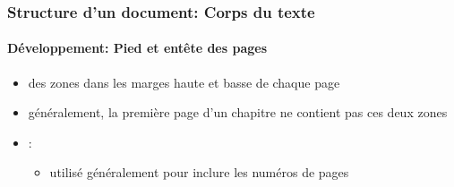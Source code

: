 \documentclass[xcolor=table]{beamer}
\begin{document}
\begin{frame}
\frametitle{Structure d'un document: Corps du texte}
\framesubtitle{Développement: Pied et entête des pages}

\begin{minipage}{0.52\textwidth}
	\begin{itemize}
		\item des zones dans les marges haute et basse de chaque page 
		\item généralement, la première page d'un chapitre ne contient pas ces deux zones 
		\item {}: 
		\begin{itemize}
			\item utilisé généralement pour inclure les numéros de pages
		\end{itemize}
		

\end{itemize}
\end{minipage}
\end{frame}
\end{document}
